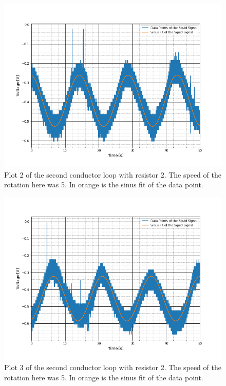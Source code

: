 \begin{figure}[ht]
	\includegraphics[scale=0.5]{Bild/r2_5_2}
	\centering
	\caption[Plot of second conductor loop 2]{Plot 2 of the second conductor loop with resistor 2. The speed of the rotation here was 5. In orange is the sinus fit of the data point.}
\end{figure}
\begin{figure}[ht]
	\includegraphics[scale=0.5]{Bild/r2_5_3}
	\centering
	\caption[Plot of second conductor loop 3]{Plot 3 of the second conductor loop with resistor 2. The speed of the rotation here was 5. In orange is the sinus fit of the data point.}
\end{figure}
